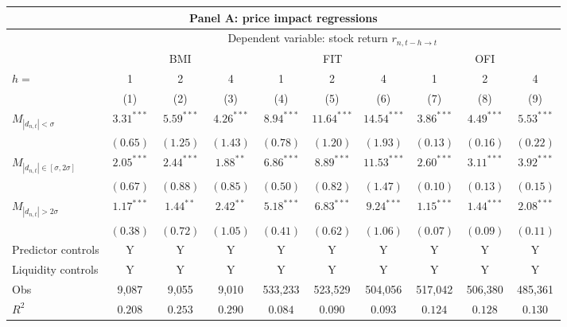 \begin{tabular}{lccccccccc}
  \hline \multicolumn{10}{c}{Panel A: price impact regressions} \\
 \hline
                                    & \multicolumn{9}{c}{Dependent variable: stock return $r_{n,t-h \rightarrow t}$} \\

                                    \cmidrule(l){2-10} & \multicolumn{3}{c}{BMI} & \multicolumn{3}{c}{FIT} & \multicolumn{3}{c}{OFI} \\
  \cmidrule(l){2-4} \cmidrule(l){5-7} \cmidrule(l){8-10} $h=$ & 1 & 2 & 4 & 1 & 2 & 4 & 1 & 2 & 4 \\

                                    \cmidrule(l){2-4} \cmidrule(l){5-7} \cmidrule(l){8-10} 
  & (1) & (2) & (3) & (4) & (5) & (6) & (7) & (8) & (9) \\ 
  $M_{|d_{n,t}| < \sigma}$ & $3.31^{***}$ & $5.59^{***}$ & $4.26^{***}$ & $8.94^{***}$ & $11.64^{***}$ & $14.54^{***}$ & $3.86^{***}$ & $4.49^{***}$ & $5.53^{***}$ \\ 
   & $(0.65)$ & $(1.25)$ & $(1.43)$ & $(0.78)$ & $(1.20)$ & $(1.93)$ & $(0.13)$ & $(0.16)$ & $(0.22)$ \\ 
  $M_{|d_{n,t}| \in [\sigma, 2\sigma]}$ & $2.05^{***}$ & $2.44^{***}$ & $1.88^{**}$ & $6.86^{***}$ & $8.89^{***}$ & $11.53^{***}$ & $2.60^{***}$ & $3.11^{***}$ & $3.92^{***}$ \\ 
   & $(0.67)$ & $(0.88)$ & $(0.85)$ & $(0.50)$ & $(0.82)$ & $(1.47)$ & $(0.10)$ & $(0.13)$ & $(0.15)$ \\ 
  $M_{|d_{n,t}| > 2 \sigma}$ & $1.17^{***}$ & $1.44^{**}$ & $2.42^{**}$ & $5.18^{***}$ & $6.83^{***}$ & $9.24^{***}$ & $1.15^{***}$ & $1.44^{***}$ & $2.08^{***}$ \\ 
   \vspace{5pt} & $(0.38)$ & $(0.72)$ & $(1.05)$ & $(0.41)$ & $(0.62)$ & $(1.06)$ & $(0.07)$ & $(0.09)$ & $(0.11)$ \\ 
  Predictor controls & Y & Y & Y & Y & Y & Y & Y & Y & Y \\ 
   \vspace{5pt}Liquidity controls & Y & Y & Y & Y & Y & Y & Y & Y & Y \\ 
  Obs & 9,087 & 9,055 & 9,010 & 533,233 & 523,529 & 504,056 & 517,042 & 506,380 & 485,361 \\ 
  $R^2$ & $0.208$ & $0.253$ & $0.290$ & $0.084$ & $0.090$ & $0.093$ & $0.124$ & $0.128$ & $0.130$ \\ 

\end{tabular}
